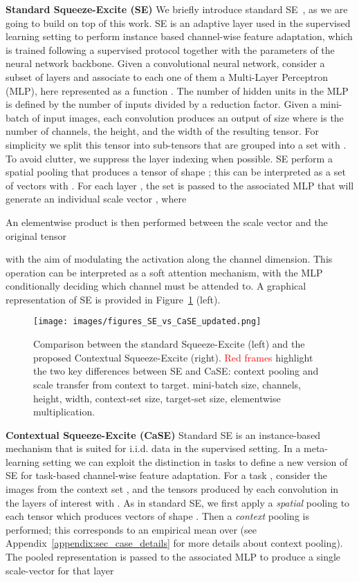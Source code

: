 \documentclass{article}
\begin{document}
\textbf{Standard Squeeze-Excite (SE)} We briefly introduce standard SE~\citep{hu2018squeeze}, as we are going to build on top of this work. SE is an adaptive layer used in the supervised learning setting to perform instance based channel-wise feature adaptation, which is trained following a supervised protocol together with the parameters of the neural network backbone.
Given a convolutional neural network, consider a subset of  layers and associate to each one of them a Multi-Layer Perceptron (MLP), here represented as a function . The number of hidden units in the MLP is defined by the number of inputs divided by a reduction factor.
Given a mini-batch of  input images, each convolution produces an output of size  where  is the number of channels,  the height, and  the width of the resulting tensor. For simplicity we split this tensor into sub-tensors that are grouped into a set  with . To avoid clutter, we suppress the layer indexing when possible.
SE perform a spatial pooling that produces a tensor of shape ; this can be interpreted as a set of vectors  with . For each layer , the set is passed to the associated MLP that will generate an individual scale vector , where

An elementwise product is then performed between the scale vector and the original tensor 

with the aim of modulating the activation along the channel dimension. This operation can be interpreted as a soft attention mechanism, with the MLP conditionally deciding which channel must be attended to. A graphical representation of SE is provided in Figure~\ref{fig:comparison_se_case} (left).

\begin{figure}[t]
  \centering
  \texttt{[image: images/figures\_SE\_vs\_CaSE\_updated.png]}
  \caption{Comparison between the standard Squeeze-Excite (left) and the proposed Contextual Squeeze-Excite (right). \textcolor{red}{Red frames} highlight the two key differences between SE and CaSE: context pooling and scale transfer from context to target.
   mini-batch size,  channels,  height,  width,  context-set size,  target-set size,  elementwise multiplication.}
  \label{fig:comparison_se_case}
\end{figure}

\textbf{Contextual Squeeze-Excite (CaSE)} Standard SE is an instance-based mechanism that is suited for i.i.d. data in the supervised setting. In a meta-learning setting we can exploit the distinction in tasks to define a new version of SE for task-based channel-wise feature adaptation. For a task , consider the  images from the context set , and the tensors produced by each convolution in the layers of interest  with .
As in standard SE, we first apply a \emph{spatial} pooling to each tensor  which produces  vectors  of shape . Then a \emph{context} pooling is performed; this corresponds to an empirical mean over  (see Appendix~\ref{appendix:sec_case_details} for more details about context pooling). The pooled representation is passed to the associated MLP to produce a single scale-vector for that layer
\end{document}
